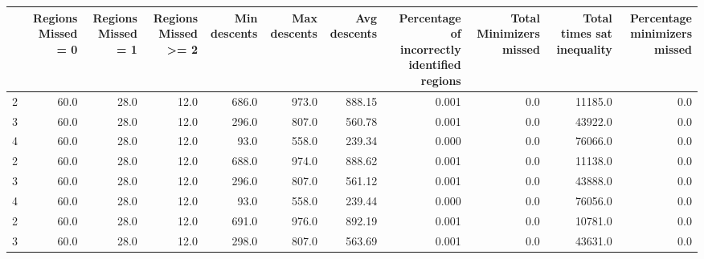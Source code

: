 \begin{tabular}{lrrrrrrrrrr}
\toprule
{} &  Regions Missed = 0 &  Regions Missed = 1 &  Regions Missed >= 2 &  Min descents &  Max descents &  Avg descents &  Percentage of incorrectly identified regions &  Total Minimizers missed &  Total times sat inequality &  Percentage minimizers missed \\
\midrule
2 &                60.0 &                28.0 &                 12.0 &         686.0 &         973.0 &        888.15 &                                         0.001 &                      0.0 &                     11185.0 &                           0.0 \\
3 &                60.0 &                28.0 &                 12.0 &         296.0 &         807.0 &        560.78 &                                         0.001 &                      0.0 &                     43922.0 &                           0.0 \\
4 &                60.0 &                28.0 &                 12.0 &          93.0 &         558.0 &        239.34 &                                         0.000 &                      0.0 &                     76066.0 &                           0.0 \\
2 &                60.0 &                28.0 &                 12.0 &         688.0 &         974.0 &        888.62 &                                         0.001 &                      0.0 &                     11138.0 &                           0.0 \\
3 &                60.0 &                28.0 &                 12.0 &         296.0 &         807.0 &        561.12 &                                         0.001 &                      0.0 &                     43888.0 &                           0.0 \\
4 &                60.0 &                28.0 &                 12.0 &          93.0 &         558.0 &        239.44 &                                         0.000 &                      0.0 &                     76056.0 &                           0.0 \\
2 &                60.0 &                28.0 &                 12.0 &         691.0 &         976.0 &        892.19 &                                         0.001 &                      0.0 &                     10781.0 &                           0.0 \\
3 &                60.0 &                28.0 &                 12.0 &         298.0 &         807.0 &        563.69 &                                         0.001 &                      0.0 &                     43631.0 &                           0.0 \\

\end{tabular}
